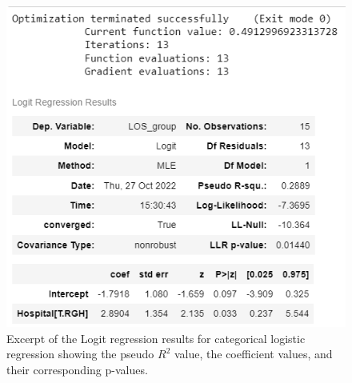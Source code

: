 \documentclass[../thesis.tex]{subfiles}
\begin{document}
\begin{figure}[h!]
    \centering
    \includegraphics{Chapters/Chapter3/Figures/Logit_cat_results.png}
    \caption{Excerpt of the Logit regression results for categorical logistic regression showing the pseudo \(R^2\) value, the coefficient values, and their corresponding p-values.}
    \label{fig:OLSCatLogReg}
\end{figure}
\end{document}
